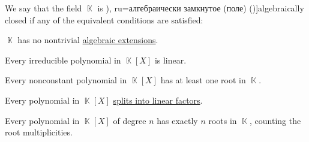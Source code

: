 \begin{definition}\label{def:algebraically_closed_field}
  We say that the field \( \BbbK \) is \term[bg=алгебрически затворено (поле) (\cite[217]{ГеновМиховскиМоллов1991Алгебра}), ru=алгебраически замкнутое (поле) (\cite[106]{Винберг2014КурсАлгебры})]{algebraically closed} if any of the equivalent conditions are satisfied:
  \begin{thmenum}
     \( \BbbK \) has no nontrivial \hyperref[def:algebraic_extension]{algebraic extensions}.

    \medskip

     Every irreducible polynomial in \( \BbbK[X] \) is linear.

    \medskip

     Every nonconstant polynomial in \( \BbbK[X] \) has at least one root in \( \BbbK \).

    \mimprovised Every polynomial in \( \BbbK[X] \) \hyperref[def:splitting_field]{splits into linear factors}.

    \mimprovised Every polynomial in \( \BbbK[X] \) of degree \( n \) has exactly \( n \) roots in \( \BbbK \), counting the root multiplicities.
  \end{thmenum}
\end{definition}
